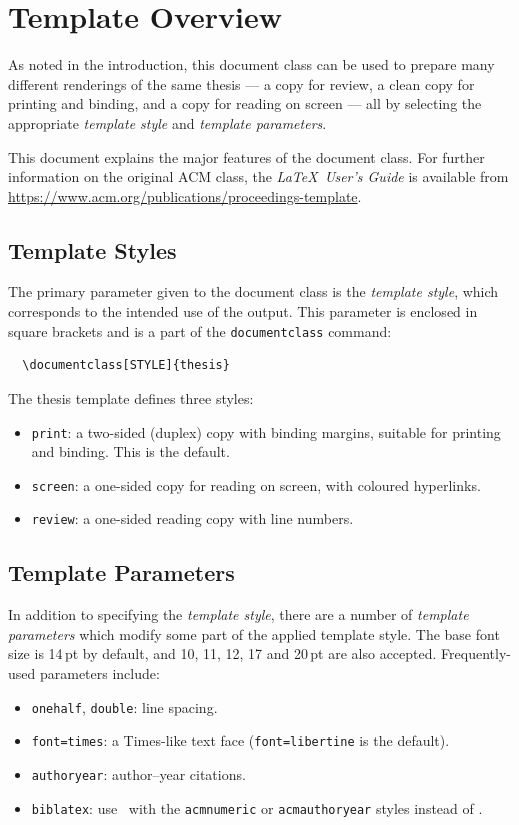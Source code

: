 \chapter{Template Overview}
\label{ch:overview}

As noted in the introduction, this document class can be used to prepare
many different renderings of the same thesis --- a copy for review, a
clean copy for printing and binding, and a copy for reading on screen ---
all by selecting the appropriate {\itshape template style} and {\itshape
  template parameters}.

This document explains the major features of the document class. For
further information on the original ACM class, the {\itshape \LaTeX\
User's Guide} is available from
\url{https://www.acm.org/publications/proceedings-template}.

\section{Template Styles}
\label{sec:styles}

The primary parameter given to the document class is the {\itshape
  template style}, which corresponds to the intended use of the output.
This parameter is enclosed in square brackets and is a part of the
\verb|documentclass| command:
\begin{verbatim}
  \documentclass[STYLE]{thesis}
\end{verbatim}

The thesis template defines three styles:
\begin{itemize}
\item {\texttt{print}}: a two-sided (duplex) copy with binding margins,
  suitable for printing and binding. This is the default.
\item {\texttt{screen}}: a one-sided copy for reading on screen, with
  coloured hyperlinks.
\item {\texttt{review}}: a one-sided reading copy with line numbers.
\end{itemize}

\section{Template Parameters}
\label{sec:parameters}

In addition to specifying the {\itshape template style}, there are a
number of {\itshape template parameters} which modify some part of the
applied template style. The base font size is 14\,pt by default, and
10, 11, 12, 17 and 20\,pt are also accepted. Frequently-used parameters
include:
\begin{itemize}
\item {\texttt{onehalf}}, {\texttt{double}}: line spacing.
\item {\texttt{font=times}}: a Times-like text face ({\texttt{font=libertine}}
  is the default).
\item {\texttt{authoryear}}: author--year citations.
\item {\texttt{biblatex}}: use \BibLaTeX\ with the \texttt{acmnumeric}
  or \texttt{acmauthoryear} styles instead of \BibTeX.
\end{itemize}



